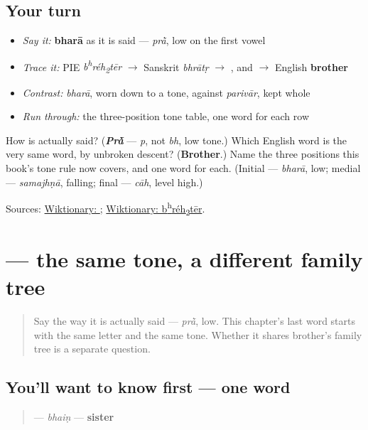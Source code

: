 \subsection*{Your turn}
\begin{itemize}
\raggedright
  \item \emph{Say it:} \textbf{bharā} as it is said — \emph{prā̀}, low on the first vowel
  \item \emph{Trace it:} PIE \emph{b\textsuperscript{h}réh\textsubscript{2}tēr} $\to$ Sanskrit \emph{bhrātṛ} $\to$ \textbf{}, and $\to$ English \textbf{brother}
  \item \emph{Contrast:} \emph{bharā}, worn down to a tone, against \emph{parivār}, kept whole
  \item \emph{Run through:} the three-position tone table, one word for each row
\end{itemize}

\begin{tcolorbox}[breakable,colback=teal!4,colframe=teal!35!black,title={Before you move on}]
How is \textbf{} actually said? (\emph{\textbf{Prā̀}} — \emph{p}, not \emph{bh}, low tone.) Which English word is the very same word, by unbroken descent? (\textbf{Brother}.) Name the three positions this book's tone rule now covers, and one word for each. (Initial — \emph{bharā}, low; medial — \emph{samajhṇā}, falling; final — \emph{cāh}, level high.)

Sources: \href{https://en.wiktionary.org/wiki/\%E0\%A8\%AD\%E0\%A8\%B0\%E0\%A8\%BE}{Wiktionary: }; \href{https://en.wiktionary.org/wiki/Reconstruction:Proto-Indo-European/b\%CA\%B0r\%C3\%A9h\%E2\%82\%82t\%C4\%93r}{Wiktionary: b\textsuperscript{h}réh\textsubscript{2}tēr}.
\end{tcolorbox}
\section[\texorpdfstring{\pa{ਭੈਣ} (bhaiṇ)}{ਭੈਣ (bhaiṇ)}]{ — the same tone, a different family tree}

\label{lesson:PA-C11-bhain}



\begin{quote}
Say \textbf{} the way it is actually said — \emph{prā̀}, low. This chapter's last word starts with the same letter and the same tone. Whether it shares brother's family tree is a separate question.
\end{quote}

\subsection*{You'll want to know first — one word}
\begin{quote}
\textbf{} — \emph{bhaiṇ} — \textbf{sister}
\end{quote}

